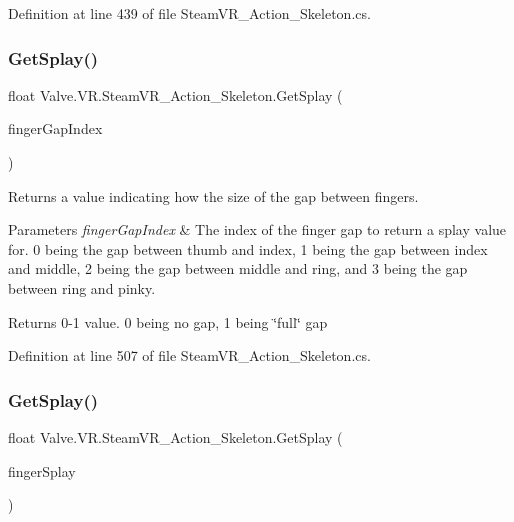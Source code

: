 Definition at line 439 of file Steam\+V\+R\+\_\+\+Action\+\_\+\+Skeleton.\+cs.

\mbox{\label{class_valve_1_1_v_r_1_1_steam_v_r___action___skeleton_a773e082038a769ac28aa2b81899de33e}} 
\subsubsection{\texorpdfstring{GetSplay()}{GetSplay()}\hspace{0.1cm}{\footnotesize\ttfamily [1/2]}}
{\footnotesize\ttfamily float Valve.\+V\+R.\+Steam\+V\+R\+\_\+\+Action\+\_\+\+Skeleton.\+Get\+Splay (\begin{DoxyParamCaption}\item[{int}]{finger\+Gap\+Index }\end{DoxyParamCaption})}



Returns a value indicating how the size of the gap between fingers. 


\begin{DoxyParams}{Parameters}
{\em finger\+Gap\+Index} & The index of the finger gap to return a splay value for. 0 being the gap between thumb and index, 1 being the gap between index and middle, 2 being the gap between middle and ring, and 3 being the gap between ring and pinky.\\
\hline
\end{DoxyParams}
\begin{DoxyReturn}{Returns}
0-\/1 value. 0 being no gap, 1 being \char`\"{}full\char`\"{} gap
\end{DoxyReturn}


Definition at line 507 of file Steam\+V\+R\+\_\+\+Action\+\_\+\+Skeleton.\+cs.

\mbox{\label{class_valve_1_1_v_r_1_1_steam_v_r___action___skeleton_ad5a524b798d0f4fcfe29daf558e9b880}} 
\subsubsection{\texorpdfstring{GetSplay()}{GetSplay()}\hspace{0.1cm}{\footnotesize\ttfamily [2/2]}}
{\footnotesize\ttfamily float Valve.\+V\+R.\+Steam\+V\+R\+\_\+\+Action\+\_\+\+Skeleton.\+Get\+Splay (\begin{DoxyParamCaption}\item[{\mbox{\hyperlink{namespace_valve_1_1_v_r_a43c97e13fe46f0575986b9f74945e0bf}{Steam\+V\+R\+\_\+\+Skeleton\+\_\+\+Finger\+Splay\+Index\+Enum}}}]{finger\+Splay }\end{DoxyParamCaption})}



